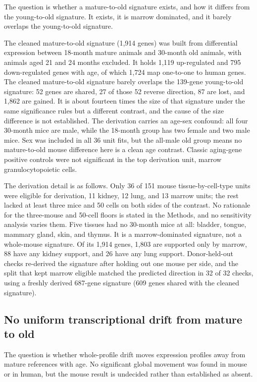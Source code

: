\documentclass[11pt]{article}
\begin{document}
The question is whether a mature-to-old signature exists, and how it differs from the young-to-old signature. It exists, it is marrow dominated, and it barely overlaps the young-to-old signature.

The cleaned mature-to-old signature (1,914 genes) was built from differential expression between 18-month mature animals and 30-month old animals, with animals aged 21 and 24 months excluded. It holds 1,119 up-regulated and 795 down-regulated genes with age, of which 1,724 map one-to-one to human genes. The cleaned mature-to-old signature barely overlaps the 139-gene young-to-old signature: 52 genes are shared, 27 of those 52 reverse direction, 87 are lost, and 1,862 are gained. It is about fourteen times the size of that signature under the same significance rules but a different contrast, and the cause of the size difference is not established. The derivation carries an age-sex confound: all four 30-month mice are male, while the 18-month group has two female and two male mice. Sex was included in all 36 unit fits, but the all-male old group means no mature-to-old mouse difference here is a clean age contrast. Classic aging-gene positive controls were not significant in the top derivation unit, marrow granulocytopoietic cells.

The derivation detail is as follows. Only 36 of 151 mouse tissue-by-cell-type units were eligible for derivation, 11 kidney, 12 lung, and 13 marrow units; the rest lacked at least three mice and 50 cells on both sides of the contrast. No rationale for the three-mouse and 50-cell floors is stated in the Methods, and no sensitivity analysis varies them. Five tissues had no 30-month mice at all: bladder, tongue, mammary gland, skin, and thymus. It is a marrow-dominated signature, not a whole-mouse signature. Of its 1,914 genes, 1,803 are supported only by marrow, 88 have any kidney support, and 26 have any lung support. Donor-held-out checks re-derived the signature after holding out one mouse per side, and the split that kept marrow eligible matched the predicted direction in 32 of 32 checks, using a freshly derived 687-gene signature (609 genes shared with the cleaned signature).


\subsection*{No uniform transcriptional drift from mature to old}

The question is whether whole-profile drift moves expression profiles away from mature references with age. No significant global movement was found in mouse or in human, but the mouse result is undecided rather than established as absent.
\end{document}
